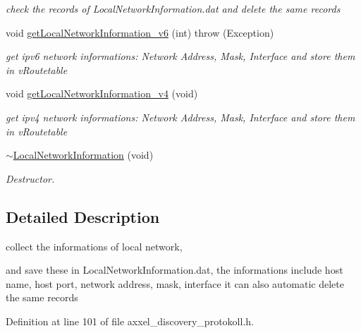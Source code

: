 \begin{DoxyCompactItemize}
\begin{DoxyCompactList}\small\item\em check the records of Local\-Network\-Information.\-dat and delete the same records \end{DoxyCompactList}\item 
void \hyperlink{classLocalNetworkInformation_abac37b86a8590ef2b7d836903a4fbb07}{get\-Local\-Network\-Information\-\_\-v6} (int)  throw (\-Exception)
\begin{DoxyCompactList}\small\item\em get ipv6 network informations\-: Network Address, Mask, Interface and store them in v\-Routetable \end{DoxyCompactList}\item 
void \hyperlink{classLocalNetworkInformation_a891ef0a500a2b652e842fa067c751782}{get\-Local\-Network\-Information\-\_\-v4} (void)
\begin{DoxyCompactList}\small\item\em get ipv4 network informations\-: Network Address, Mask, Interface and store them in v\-Routetable \end{DoxyCompactList}\item 
\hypertarget{classLocalNetworkInformation_a0b3801b5492aeceaefaa2c9d8a38c86e}{\hyperlink{classLocalNetworkInformation_a0b3801b5492aeceaefaa2c9d8a38c86e}{$\sim$\-Local\-Network\-Information} (void)}\label{classLocalNetworkInformation_a0b3801b5492aeceaefaa2c9d8a38c86e}

\begin{DoxyCompactList}\small\item\em Destructor. \end{DoxyCompactList}\end{DoxyCompactItemize}


\subsection{Detailed Description}
collect the informations of local network, 

and save these in Local\-Network\-Information.\-dat, the informations include host name, host port, network address, mask, interface it can also automatic delete the same records 

Definition at line 101 of file axxel\-\_\-discovery\-\_\-protokoll.\-h.



